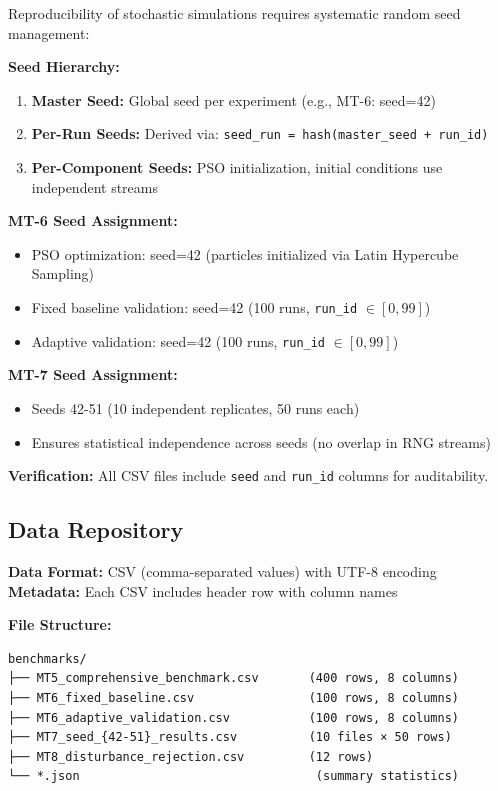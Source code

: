 Reproducibility of stochastic simulations requires systematic random seed management:

\textbf{Seed Hierarchy:}
\begin{enumerate}
    \item \textbf{Master Seed:} Global seed per experiment (e.g., MT-6: seed=42)
    \item \textbf{Per-Run Seeds:} Derived via: \texttt{seed\_run = hash(master\_seed + run\_id)}
    \item \textbf{Per-Component Seeds:} PSO initialization, initial conditions use independent streams
\end{enumerate}

\textbf{MT-6 Seed Assignment:}
\begin{itemize}
    \item PSO optimization: seed=42 (particles initialized via Latin Hypercube Sampling)
    \item Fixed baseline validation: seed=42 (100 runs, \texttt{run\_id} $\in [0, 99]$)
    \item Adaptive validation: seed=42 (100 runs, \texttt{run\_id} $\in [0, 99]$)
\end{itemize}

\textbf{MT-7 Seed Assignment:}
\begin{itemize}
    \item Seeds 42-51 (10 independent replicates, 50 runs each)
    \item Ensures statistical independence across seeds (no overlap in RNG streams)
\end{itemize}

\textbf{Verification:} All CSV files include \texttt{seed} and \texttt{run\_id} columns for auditability.

\subsection{Data Repository}
\label{subsec:data_repository}

\textbf{Data Format:} CSV (comma-separated values) with UTF-8 encoding
\textbf{Metadata:} Each CSV includes header row with column names

\textbf{File Structure:}
\begin{verbatim}
benchmarks/
├── MT5_comprehensive_benchmark.csv       (400 rows, 8 columns)
├── MT6_fixed_baseline.csv                (100 rows, 8 columns)
├── MT6_adaptive_validation.csv           (100 rows, 8 columns)
├── MT7_seed_{42-51}_results.csv          (10 files × 50 rows)
├── MT8_disturbance_rejection.csv         (12 rows)
└── *.json                                 (summary statistics)
\end{verbatim}


